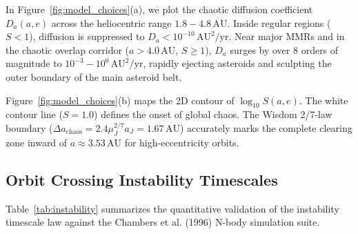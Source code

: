 \documentclass[11pt,a4paper]{article}
\begin{document}
In Figure~\ref{fig:model_choices}(a), we plot the chaotic diffusion coefficient $D_a(a, e)$ across the heliocentric range $1.8 - 4.8\,\text{AU}$. Inside regular regions ($S < 1$), diffusion is suppressed to $D_a < 10^{-10}\,\text{AU}^2/\text{yr}$. Near major MMRs and in the chaotic overlap corridor ($a > 4.0\,\text{AU}$, $S \ge 1$), $D_a$ surges by over 8 orders of magnitude to $10^{-3} - 10^0\,\text{AU}^2/\text{yr}$, rapidly ejecting asteroids and sculpting the outer boundary of the main asteroid belt.

Figure~\ref{fig:model_choices}(b) maps the 2D contour of $\log_{10} S(a, e)$. The white contour line ($S = 1.0$) defines the onset of global chaos. The Wisdom 2/7-law boundary ($\Delta a_{\text{chaos}} = 2.4 \mu_J^{2/7} a_J = 1.67\,\text{AU}$) accurately marks the complete clearing zone inward of $a \approx 3.53\,\text{AU}$ for high-eccentricity orbits.

\subsection{Orbit Crossing Instability Timescales}
Table~\ref{tab:instability} summarizes the quantitative validation of the instability timescale law against the Chambers et al. (1996) N-body simulation suite.
\end{document}
